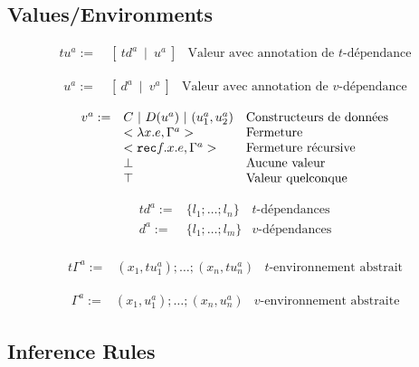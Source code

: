\documentclass{article}
\newcommand\rec[3]{{\tt rec} #1.#2.#3}
\newcommand\closure[3]{< \lambda #1.#2, #3 >}
\newcommand\recclosure[4]{< \rec{#1}{#2}{#3}, #4 >}
\newcommand\atval[2]{\ [\ #1\ \mid\ #2\ ]}
\newcommand\aval[2]{\ [\ #1\ \mid\ #2\ ]}
\begin{document}
\subsection{Values/Environments}

$$
\begin{array}{rll}
tu^{a} := & \atval{td^{a}}{u^{a}} & \mbox{Valeur avec annotation de $t$-dépendance}
\end{array}
$$

$$
\begin{array}{rll}
u^{a} := & \aval{d^{a}}{v^{a}} & \mbox{Valeur avec annotation de $v$-dépendance}
\end{array}
$$

$$
\begin{array}{rll}
v^{a} := & C\ |\ D(u^{a})\ |\ (u^{a}_1, u^{a}_2) & \mbox{Constructeurs de données} \\
     & \closure{x}{e}{\Gamma^{a}} & \mbox{Fermeture}\\
     & \recclosure{f}{x}{e}{\Gamma^{a}} & \mbox{Fermeture récursive}\\
     & \bot & \mbox{Aucune valeur}\\
     & \top & \mbox{Valeur quelconque}
\end{array}
$$

$$
\begin{array}{rll}
td^{a} := & \{l_1; \ldots; l_n\} & \mbox{$t$-dépendances}\\
d^{a} := & \{l_1; \ldots; l_m\} & \mbox{$v$-dépendances}\\
\end{array}
$$

$$
\begin{array}{rll}
t\Gamma^{a} := & (x_1, tu^{a}_1); \ldots ; (x_n, tu^{a}_n) & \mbox{$t$-environnement abstrait}
\end{array}
$$

$$
\begin{array}{rll}
\Gamma^{a} := & (x_1, u^{a}_1); \ldots ; (x_n, u^{a}_n) & \mbox{$v$-environnement abstraite}
\end{array}
$$

\subsection{Inference Rules}
\end{document}
